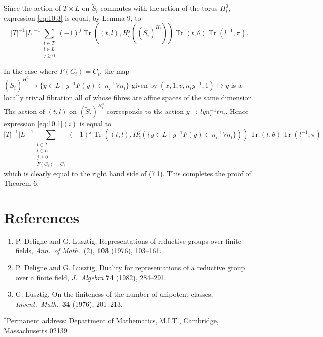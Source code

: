 \documentclass[12pt,a4paper]{article}
\theoremstyle{plain}
\theoremstyle{remark}
\DeclareMathOperator{\Tr}{Tr}
\begin{document}
Since the action of $T \times L$ on $\tilde{S}_i$ commutes with the action of the torus $H_i^0$, expression \eqref{eq:10.3} is equal, by Lemma 9, to
\begin{equation*}
|T|^{-1} |L|^{-1} \sum_{\substack{t \in T \\ l \in L \\ j \geq 0}} (-1)^j \Tr((t,l), H_c^j((\tilde{S}_i)^{H_i^0})) \Tr(t, \theta) \Tr(l^{-1}, \pi).
\end{equation*}

In the case where $F(C_i) = C_i$, the map $(\tilde{S}_i)^{H_i^0} \to \{y \in L \mid y^{-1}F(y) \in n_i^{-1}Vn_i\}$ given by $(x,1,v,n_iy^{-1},1) \mapsto y$ is a locally trivial fibration all of whose fibres are affine spaces of the same dimension. The action of $(t,l)$ on $(\tilde{S}_i)^{H_i^0}$ corresponds to the action $y \mapsto lyn_i^{-1}tn_i$. Hence expression \eqref{eq:10.1}$(i)$ is equal to
\begin{equation*}
|T|^{-1} |L|^{-1} \sum_{\substack{t \in T \\ l \in L \\ j \geq 0 \\ F(C_i) = C_i}} (-1)^j \Tr((t,l), H_c^j(\{y \in L \mid y^{-1}F(y) \in n_i^{-1}Vn_i\})) \Tr(t, \theta) \Tr(l^{-1}, \pi)
\end{equation*}
which is clearly equal to the right hand side of (7.1). This completes the proof of Theorem 6.

\section*{References}

\begin{enumerate}
\item[{[5]}] P. Deligne and G. Lusztig, Representations of reductive groups over finite fields, \textit{Ann.\ of Math.}\ (2), \textbf{103} (1976), 103--161.

\item[{[6]}] P. Deligne and G. Lusztig, Duality for representations of a reductive group over a finite field, \textit{J.\ Algebra} \textbf{74} (1982), 284--291.

\item[{[7]}] G. Lusztig, On the finiteness of the number of unipotent classes, \textit{Invent.\ Math.}\ \textbf{34} (1976), 201--213.
\end{enumerate}

\vspace{1em}

{\small
$^*$Permanent address: Department of Mathematics, M.I.T., Cambridge, Massachusetts 02139.
}
\end{document}
